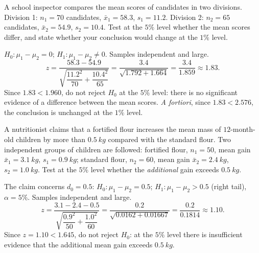 \documentclass[11pt]{article}
\begin{document}
\begin{exercice}
A school inspector compares the mean scores of candidates in two divisions. Division 1: $n_1=70$ candidates, $\bar{x}_1=58.3$, $s_1=11.2$. Division 2: $n_2=65$ candidates, $\bar{x}_2=54.9$, $s_2=10.4$. Test at the $5\%$ level whether the mean scores differ, and state whether your conclusion would change at the $1\%$ level.
\end{exercice}

\begin{corrige}[Exercise 1]
$H_0:\mu_1-\mu_2=0$; $H_1:\mu_1-\mu_2\neq 0$. Samples independent and large.
\[ z=\frac{58.3-54.9}{\sqrt{\dfrac{11.2^2}{70}+\dfrac{10.4^2}{65}}}
=\frac{3.4}{\sqrt{1.792+1.664}}
=\frac{3.4}{1.859}\approx 1.83. \]
Since $1.83<1.960$, do not reject $H_0$ at the $5\%$ level: there is no significant evidence of a difference between the mean scores. \emph{A fortiori}, since $1.83<2.576$, the conclusion is unchanged at the $1\%$ level.
\end{corrige}

\begin{exercice}
A nutritionist claims that a fortified flour increases the mean mass of $12$-month-old children by more than $\SI{0.5}{kg}$ compared with the standard flour. Two independent groups of children are followed: fortified flour, $n_1=50$, mean gain $\bar{x}_1=\SI{3.1}{kg}$, $s_1=\SI{0.9}{kg}$; standard flour, $n_2=60$, mean gain $\bar{x}_2=\SI{2.4}{kg}$, $s_2=\SI{1.0}{kg}$. Test at the $5\%$ level whether the \emph{additional} gain exceeds $\SI{0.5}{kg}$.
\end{exercice}

\begin{corrige}[Exercise 2]
The claim concerns $d_0=0.5$: $H_0:\mu_1-\mu_2=0.5$; $H_1:\mu_1-\mu_2>0.5$ (right tail), $\alpha=5\%$. Samples independent and large.
\[ z=\frac{3.1-2.4-0.5}{\sqrt{\dfrac{0.9^2}{50}+\dfrac{1.0^2}{60}}}
=\frac{0.2}{\sqrt{0.0162+0.01667}}
=\frac{0.2}{0.1814}\approx 1.10. \]
Since $z=1.10<1.645$, do not reject $H_0$: at the $5\%$ level there is insufficient evidence that the additional mean gain exceeds $\SI{0.5}{kg}$.
\end{corrige}
\end{document}
